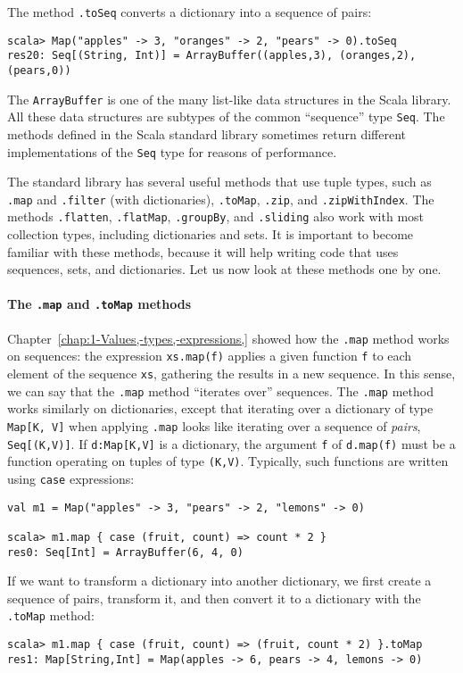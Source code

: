 The method \lstinline!.toSeq! converts a dictionary into a sequence
of pairs:
\begin{lstlisting}
scala> Map("apples" -> 3, "oranges" -> 2, "pears" -> 0).toSeq
res20: Seq[(String, Int)] = ArrayBuffer((apples,3), (oranges,2), (pears,0))
\end{lstlisting}
The \lstinline!ArrayBuffer! is one of the many list-like data structures
in the Scala library. All these data structures are subtypes of the
common ``sequence'' type \lstinline!Seq!. The methods defined in
the Scala standard library sometimes return different implementations
of the \lstinline!Seq! type for reasons of performance.

The standard library has several useful methods that use tuple types,
such as \lstinline!.map! and \lstinline!.filter! (with dictionaries),
\lstinline!.toMap!, \lstinline!.zip!, and \lstinline!.zipWithIndex!.
The methods \lstinline!.flatten!, \lstinline!.flatMap!, \lstinline!.groupBy!,
and \lstinline!.sliding! also work with most collection types, including
dictionaries and sets. It is important to become familiar with these
methods, because it will help writing code that uses sequences, sets,
and dictionaries. Let us now look at these methods one by one.

\paragraph*{The \lstinline!.map! and \lstinline!.toMap! methods}

Chapter~\ref{chap:1-Values,-types,-expressions,} showed how the
\lstinline!.map! method works on sequences: the expression \lstinline!xs.map(f)!
applies a given function \lstinline!f! to each element of the sequence
\lstinline!xs!, gathering the results in a new sequence. In this
sense, we can say that the \lstinline!.map! method ``iterates over''
sequences. The \lstinline!.map! method works similarly on dictionaries,
except that iterating over a dictionary of type \lstinline!Map[K, V]!
when applying \lstinline!.map! looks like iterating over a sequence
of \emph{pairs}, \lstinline!Seq[(K,V)]!. If \lstinline!d:Map[K,V]!
is a dictionary, the argument \lstinline!f! of \lstinline!d.map(f)!
must be a function operating on tuples of type \lstinline!(K,V)!.
Typically, such functions are written using \lstinline!case! expressions:
\begin{lstlisting}
val m1 = Map("apples" -> 3, "pears" -> 2, "lemons" -> 0)

scala> m1.map { case (fruit, count) => count * 2 }
res0: Seq[Int] = ArrayBuffer(6, 4, 0)
\end{lstlisting}
If we want to transform a dictionary into another dictionary, we first
create a sequence of pairs, transform it, and then convert it to a
dictionary with the \lstinline!.toMap! method:
\begin{lstlisting}
scala> m1.map { case (fruit, count) => (fruit, count * 2) }.toMap
res1: Map[String,Int] = Map(apples -> 6, pears -> 4, lemons -> 0)
\end{lstlisting}


